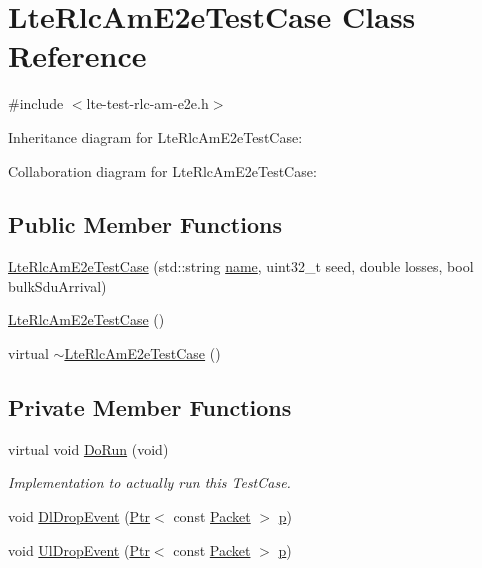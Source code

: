 \hypertarget{classLteRlcAmE2eTestCase}{}\section{Lte\+Rlc\+Am\+E2e\+Test\+Case Class Reference}
\label{classLteRlcAmE2eTestCase}


{\ttfamily \#include $<$lte-\/test-\/rlc-\/am-\/e2e.\+h$>$}



Inheritance diagram for Lte\+Rlc\+Am\+E2e\+Test\+Case\+:


Collaboration diagram for Lte\+Rlc\+Am\+E2e\+Test\+Case\+:
\subsection*{Public Member Functions}
\begin{DoxyCompactItemize}
\item 
\hyperlink{classLteRlcAmE2eTestCase_abde759871dbab8d926f3a835257e017d}{Lte\+Rlc\+Am\+E2e\+Test\+Case} (std\+::string \hyperlink{generate__test__data__lte__spectrum__model_8m_ab74e6bf80237ddc4109968cedc58c151}{name}, uint32\+\_\+t seed, double losses, bool bulk\+Sdu\+Arrival)
\item 
\hyperlink{classLteRlcAmE2eTestCase_af36c9b812693ba0c025d0a3a9fcc11a9}{Lte\+Rlc\+Am\+E2e\+Test\+Case} ()
\item 
virtual \hyperlink{classLteRlcAmE2eTestCase_afde30957bbe36d0de1167218c533f9ae}{$\sim$\+Lte\+Rlc\+Am\+E2e\+Test\+Case} ()
\end{DoxyCompactItemize}
\subsection*{Private Member Functions}
\begin{DoxyCompactItemize}
\item 
virtual void \hyperlink{classLteRlcAmE2eTestCase_a96cf405c2fe8e9a1c878c615b185d419}{Do\+Run} (void)
\begin{DoxyCompactList}\small\item\em Implementation to actually run this Test\+Case. \end{DoxyCompactList}\item 
void \hyperlink{classLteRlcAmE2eTestCase_a29f5f21aa4f70fe42aaa5315c2f6a444}{Dl\+Drop\+Event} (\hyperlink{classns3_1_1Ptr}{Ptr}$<$ const \hyperlink{classns3_1_1Packet}{Packet} $>$ \hyperlink{lte__link__budget__x2__handover__measures_8m_ac9de518908a968428863f829398a4e62}{p})
\item 
void \hyperlink{classLteRlcAmE2eTestCase_ab3e6d1006e655b2743f08a46ca8a414c}{Ul\+Drop\+Event} (\hyperlink{classns3_1_1Ptr}{Ptr}$<$ const \hyperlink{classns3_1_1Packet}{Packet} $>$ \hyperlink{lte__link__budget__x2__handover__measures_8m_ac9de518908a968428863f829398a4e62}{p})
\end{DoxyCompactItemize}
